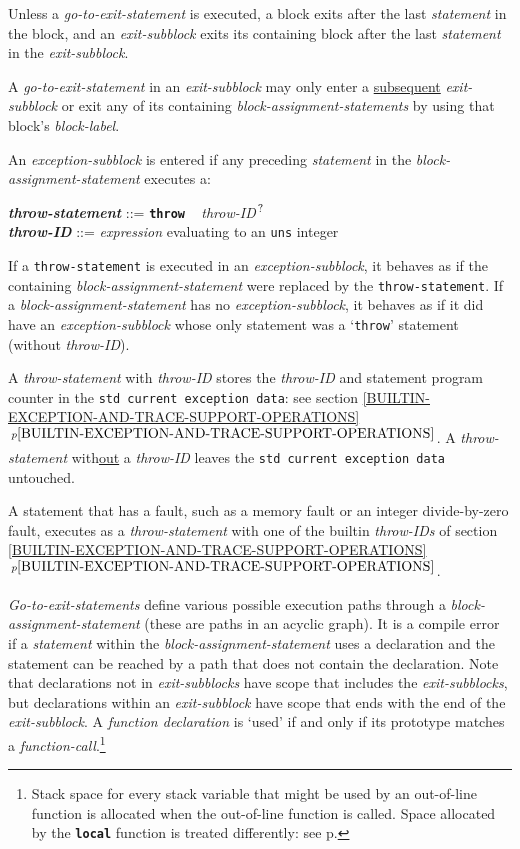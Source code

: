 \documentclass[12pt]{article}
\newcommand{\TT}[1]{{\tt \bfseries #1}}
\newcommand{\QMARK}{{$^{\,\mbox{\footnotesize ?}}$}}
\newcommand{\ttkey}[1]{{\tt \bfseries #1}}
\newcommand{\emkey}[1]{{\em \bfseries #1}}
\newcommand{\itemref}[1]{\ref{#1}$\,^{p\pageref{#1}}$}
\newcommand{\pagref}[1]{p\pageref{#1}}
\newenvironment{indpar}[1][0.3in]%
	{\begin{list}{}%
		     {\setlength{\itemsep}{0in}%
		      \setlength{\topsep}{0in}%
		      \setlength{\parsep}{1ex}%
		      \setlength{\labelwidth}{#1}%
		      \setlength{\leftmargin}{#1}%
		      \addtolength{\leftmargin}{\labelsep}}%
	 \item}%
	{\end{list}}
\begin{document}
Unless a {\em go-to-exit-statement} is executed,
a block exits after the last {\em statement} in the block,
and an {\em exit-subblock} exits its containing block after the last
{\em statement} in the {\em exit-subblock}.

A {\em go-to-exit-statement} in an {\em exit-subblock} may only enter
a \underline{subsequent} {\em exit-subblock} or exit any of its containing
{\em block-assignment-statements} by using that block's {\em block-label}.

An {\em exception-subblock} is entered if any
preceding {\em statement} in the {\em block-assignment-state\-ment}
executes a:
\begin{indpar}
\emkey{throw-statement}\label{THROW-STATEMENT} ::=
    \ttkey{throw} ~ {\em throw-ID}\QMARK{} \\
\emkey{throw-ID} ::= {\em expression} evaluating to an {\tt uns} integer
\end{indpar}
If a {\tt throw-statement} is executed in an
{\em exception-subblock}, it behaves as if the containing
{\em block-assignment-statement}
were replaced by the {\tt throw-statement}.  If a
{\em block-assignment-statement} has no {\em exception-subblock},
it behaves as if it did have an {\em exception-subblock} whose only
statement was a `{\tt throw}' statement (without {\em throw-ID}).

A {\em throw-statement} with {\em throw-ID} stores the {\em throw-ID}
and statement program counter in the {\tt std current exception data}:
see section \itemref{BUILTIN-EXCEPTION-AND-TRACE-SUPPORT-OPERATIONS}.
A {\em throw-statement} with\underline{out} a {\em throw-ID}
leaves the {\tt std current exception data} untouched.

A statement that has a fault,
such as a memory fault or an integer divide-by-zero fault,
executes as a {\em throw-statement} with one of the builtin {\em throw-IDs}
of section \itemref{BUILTIN-EXCEPTION-AND-TRACE-SUPPORT-OPERATIONS}.

{\em Go-to-exit-statements} define various possible execution
paths through a {\em block-assignment-statement}
(these are paths in an acyclic graph).
It is a compile error if a {\em statement}
within the {\em block-assignment-statement}
uses a declaration and the statement can be reached by a path that
does not contain the declaration.
Note that declarations not in {\em exit-subblocks} have scope
that includes the {\em exit-subblocks}, but declarations
within an {\em exit-subblock} have scope that ends with the end of
the {\em exit-subblock}.  A {\em function declaration}
is `used' if and only if its
prototype matches a {\em function-call}.\footnote{Stack space for every
stack variable that might be used by an out-of-line function is
allocated when the out-of-line function is called.  Space allocated
by the \TT{local} function is treated differently:  see
\pagref{OUT-OF-LINE-LOCALS}.}
\end{document}
